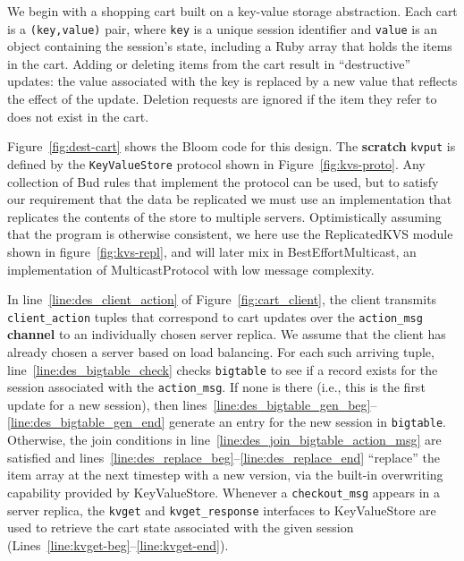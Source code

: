 We begin with a shopping cart built on a key-value storage abstraction.  Each
cart is a \texttt{(key,value)} pair, where \texttt{key} is a unique session
identifier and \texttt{value} is an object containing the session's state,
including a Ruby array that holds the items in the cart. Adding or deleting
items from the cart result in ``destructive'' updates: the value associated with
the key is replaced by a new value that reflects the effect of the
update. Deletion requests are ignored if the item they refer to does not exist
in the cart.

Figure~\ref{fig:dest-cart} shows the Bloom code for this design.  The
\textbf{scratch} \texttt{kvput} is defined by the \texttt{KeyValueStore} protocol shown
in Figure~\ref{fig:kvs-proto}.
Any collection of Bud rules that implement the protocol can be used, but to satisfy
our requirement that the data be replicated we must use an implementation that replicates
the contents of the store to multiple servers.  Optimistically assuming that the program is
otherwise consistent, we here use the ReplicatedKVS module shown in 
figure~\ref{fig:kvs-repl}, and will later mix in  BestEffortMulticast, an implementation of MulticastProtocol with low message complexity.

In line~\ref{line:des_client_action} of Figure~\ref{fig:cart_client}, the client transmits
\texttt{client\_action} tuples that correspond to cart updates over the
\texttt{action\_msg} \textbf{channel} to an individually chosen server replica.
We assume that the client has already chosen a server based on load balancing.
For each such arriving tuple, line~\ref{line:des_bigtable_check} checks
\texttt{bigtable} to see if a record exists for the session associated with the
\texttt{action\_msg}.  If none is there (i.e., this is the first update for a
new session), then
lines~\ref{line:des_bigtable_gen_beg}--\ref{line:des_bigtable_gen_end}
generate an entry for the new session in \texttt{bigtable}.  Otherwise, the
join conditions in
line~\ref{line:des_join_bigtable_action_msg}
are satisfied and lines~\ref{line:des_replace_beg}--\ref{line:des_replace_end}
``replace'' the item array at the next timestep with a new version, via the 
built-in overwriting capability provided by KeyValueStore.  
Whenever a \texttt{checkout\_msg} appears in a server replica, the
 \texttt{kvget} and \texttt{kvget\_response} interfaces to KeyValueStore are used to retrieve the cart state associated with the given session (Lines~\ref{line:kvget-beg}--\ref{line:kvget-end}).  


